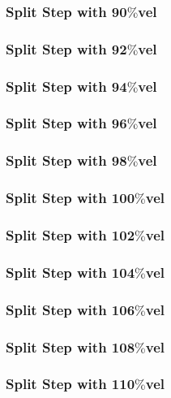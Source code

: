 \begin{frame} \frametitle{Split Step with 90$\%$vel}
\end{frame}
\begin{frame} \frametitle{Split Step with 92$\%$vel}
\end{frame}
\begin{frame} \frametitle{Split Step with 94$\%$vel}
\end{frame}
\begin{frame} \frametitle{Split Step with 96$\%$vel}
\end{frame}
\begin{frame} \frametitle{Split Step with 98$\%$vel}
\end{frame}
\begin{frame} \frametitle{Split Step with 100$\%$vel}
\end{frame}
\begin{frame} \frametitle{Split Step with 102$\%$vel}
\end{frame}
\begin{frame} \frametitle{Split Step with 104$\%$vel}
\end{frame}
\begin{frame} \frametitle{Split Step with 106$\%$vel}
\end{frame}
\begin{frame} \frametitle{Split Step with 108$\%$vel}
\end{frame}
\begin{frame} \frametitle{Split Step with 110$\%$vel}
\end{frame}


